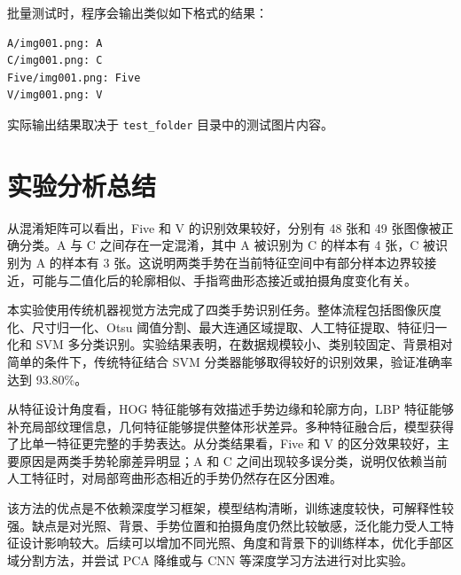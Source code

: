 \documentclass[UTF8,a4paper,10pt]{ctexart}
\begin{document}
批量测试时，程序会输出类似如下格式的结果：
\begin{lstlisting}[title=测试输出示例,frame=trbl]
A/img001.png: A
C/img001.png: C
Five/img001.png: Five
V/img001.png: V
\end{lstlisting}
实际输出结果取决于 \texttt{test\_folder} 目录中的测试图片内容。

\section{实验分析总结}
从混淆矩阵可以看出，Five 和 V 的识别效果较好，分别有 48 张和 49 张图像被正确分类。A 与 C 之间存在一定混淆，其中 A 被识别为 C 的样本有 4 张，C 被识别为 A 的样本有 3 张。这说明两类手势在当前特征空间中有部分样本边界较接近，可能与二值化后的轮廓相似、手指弯曲形态接近或拍摄角度变化有关。

本实验使用传统机器视觉方法完成了四类手势识别任务。整体流程包括图像灰度化、尺寸归一化、Otsu 阈值分割、最大连通区域提取、人工特征提取、特征归一化和 SVM 多分类识别。实验结果表明，在数据规模较小、类别较固定、背景相对简单的条件下，传统特征结合 SVM 分类器能够取得较好的识别效果，验证准确率达到 93.80\%。

从特征设计角度看，HOG 特征能够有效描述手势边缘和轮廓方向，LBP 特征能够补充局部纹理信息，几何特征能够提供整体形状差异。多种特征融合后，模型获得了比单一特征更完整的手势表达。从分类结果看，Five 和 V 的区分效果较好，主要原因是两类手势轮廓差异明显；A 和 C 之间出现较多误分类，说明仅依赖当前人工特征时，对局部弯曲形态相近的手势仍然存在区分困难。

该方法的优点是不依赖深度学习框架，模型结构清晰，训练速度较快，可解释性较强。缺点是对光照、背景、手势位置和拍摄角度仍然比较敏感，泛化能力受人工特征设计影响较大。后续可以增加不同光照、角度和背景下的训练样本，优化手部区域分割方法，并尝试 PCA 降维或与 CNN 等深度学习方法进行对比实验。

\newpage


\end{document}
